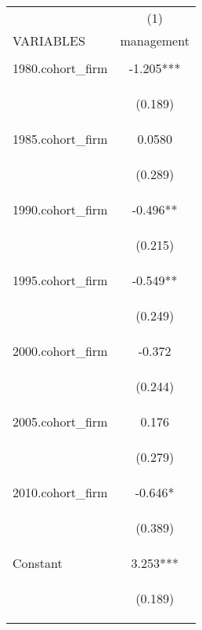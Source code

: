 \begin{center}
\begin{tabular}{lc} \hline
 & (1) \\
VARIABLES & management \\ \hline
\vspace{4pt} & \begin{footnotesize}\end{footnotesize} \\
1980.cohort\_firm & -1.205*** \\
\vspace{4pt} & \begin{footnotesize}(0.189)\end{footnotesize} \\
1985.cohort\_firm & 0.0580 \\
\vspace{4pt} & \begin{footnotesize}(0.289)\end{footnotesize} \\
1990.cohort\_firm & -0.496** \\
\vspace{4pt} & \begin{footnotesize}(0.215)\end{footnotesize} \\
1995.cohort\_firm & -0.549** \\
\vspace{4pt} & \begin{footnotesize}(0.249)\end{footnotesize} \\
2000.cohort\_firm & -0.372 \\
\vspace{4pt} & \begin{footnotesize}(0.244)\end{footnotesize} \\
2005.cohort\_firm & 0.176 \\
\vspace{4pt} & \begin{footnotesize}(0.279)\end{footnotesize} \\
2010.cohort\_firm & -0.646* \\
\vspace{4pt} & \begin{footnotesize}(0.389)\end{footnotesize} \\
Constant & 3.253*** \\
 & \begin{footnotesize}(0.189)\end{footnotesize} \\

\end{tabular}
\end{center}
